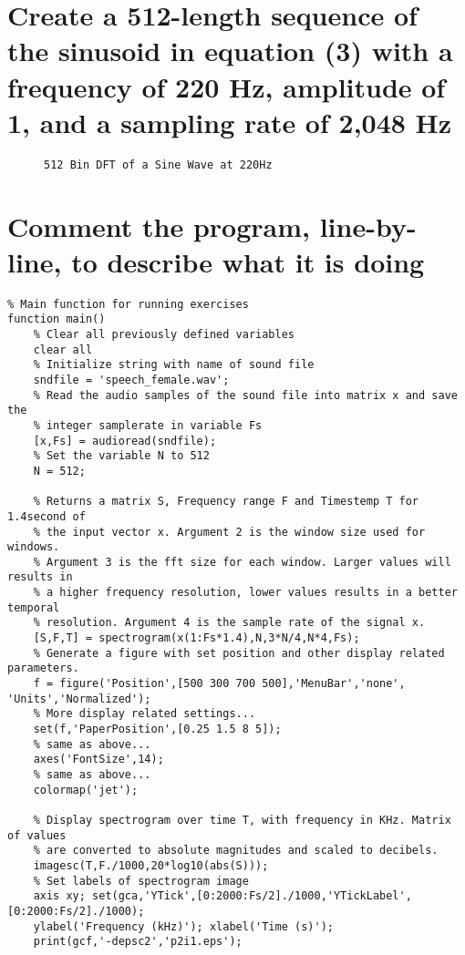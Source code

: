 \documentclass[titlepage]{scrartcl}
\newcommand{\code}[1]{\texttt{#1}}
\begin{document}
\section{Create a 512-length sequence of the sinusoid in equation (3) with a
frequency of 220 Hz, amplitude of 1, and a sampling rate of 2,048 Hz}
\begin{figure}[H]
    \caption{\code{512 Bin DFT of a Sine Wave at 220Hz}}
\end{figure}

\section{Comment the program, line-by- line, to describe what it is doing}
\begin{lstlisting}
% Main function for running exercises
function main()
    % Clear all previously defined variables
    clear all
    % Initialize string with name of sound file
    sndfile = 'speech_female.wav';
    % Read the audio samples of the sound file into matrix x and save the
    % integer samplerate in variable Fs
    [x,Fs] = audioread(sndfile);
    % Set the variable N to 512
    N = 512;

    % Returns a matrix S, Frequency range F and Timestemp T for 1.4second of
    % the input vector x. Argument 2 is the window size used for windows.
    % Argument 3 is the fft size for each window. Larger values will results in
    % a higher frequency resolution, lower values results in a better temporal
    % resolution. Argument 4 is the sample rate of the signal x.
    [S,F,T] = spectrogram(x(1:Fs*1.4),N,3*N/4,N*4,Fs);
    % Generate a figure with set position and other display related parameters.
    f = figure('Position',[500 300 700 500],'MenuBar','none', 'Units','Normalized');
    % More display related settings...
    set(f,'PaperPosition',[0.25 1.5 8 5]);
    % same as above...
    axes('FontSize',14);
    % same as above...
    colormap('jet');

    % Display spectrogram over time T, with frequency in KHz. Matrix of values
    % are converted to absolute magnitudes and scaled to decibels.
    imagesc(T,F./1000,20*log10(abs(S)));
    % Set labels of spectrogram image
    axis xy; set(gca,'YTick',[0:2000:Fs/2]./1000,'YTickLabel',[0:2000:Fs/2]./1000);
    ylabel('Frequency (kHz)'); xlabel('Time (s)');
    print(gcf,'-depsc2','p2i1.eps');
\end{lstlisting}
\end{document}
